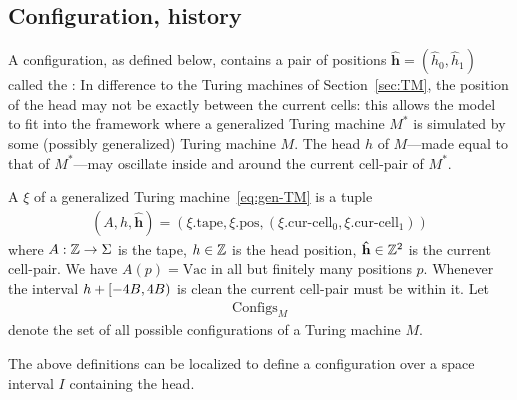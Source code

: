\documentclass[11pt]{memoir}
\theoremstyle{definition} %
\renewcommand{\vek}[1]{\mathbf{#1}}
\def\B{B}
\newcommand{\Configs}{\mathrm{Configs}}
\newcommand{\h}{h} %
\newcommand{\hc}{\hat h}
\newcommand{\vhc}{\vek{\hat h}}
\newcommand{\pos}{\mathrm{pos}}
\newcommand{\curcell}{\textrm{cur-cell}}
\newcommand{\tape}{\mathrm{tape}}
\newcommand{\Vacant}{\mathrm{Vac}}
\begin{document}
\subsection{Configuration, history}\label{sec:gen-TM}

A configuration, as defined below, contains a pair of positions
\( \vhc = (\hc_{0},\hc_{1}) \) called the :
In difference to the Turing machines of Section~\ref{sec:TM},
the position of the head may not be exactly between the current cells: this allows the model
to fit into the framework where 
a generalized Turing machine \( M^{*} \) is simulated by some (possibly
generalized) Turing machine \( M \).
The head \( h \) of \( M \)---made equal to that of \( M^{*} \)---may
oscillate inside and around the current cell-pair of \( M^{*} \).

\begin{definition}[Configuration]\label{def:config}
    A  \( \xi \) of a generalized Turing machine~\eqref{eq:gen-TM} is a tuple
    \begin{align*}
      (A,\h,\vhc) = (\xi.\tape,\xi.\pos, (\xi.\curcell_{0},\xi.\curcell_{1}))
    \end{align*}
    where \( A:\mathbb{Z}\to\Sigma \) is the tape, \( \h \in\bbZ \) is the head position, \( \vhc\in\bbZ^{2} \)
    is the current cell-pair.
    We have \( A(p)=\Vacant \) in all but finitely many positions \( p \).
Whenever the interval \( \h+\lint{-4\B}{4\B} \) is clean the current cell-pair
must be within it. %
Let
    \begin{align*}
         \Configs_{M}
    \end{align*}
    denote the set of all possible configurations of a Turing machine \( M \).
\end{definition}

The above definitions can be localized to define a configuration 
over a space interval \( I \) containing the head.
\end{document}

